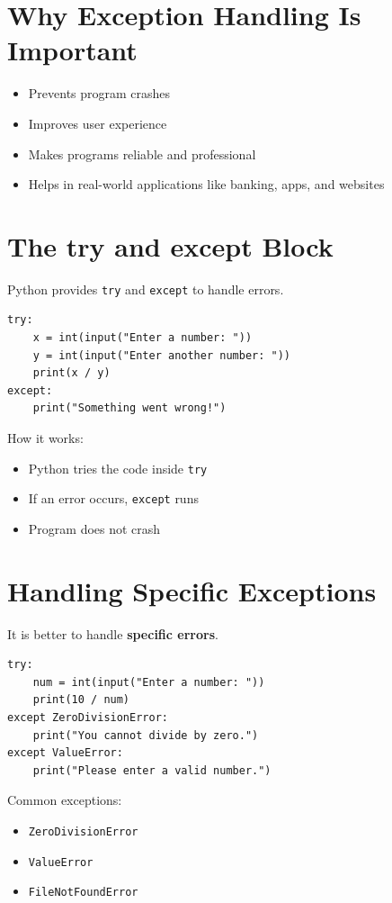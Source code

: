 \section{Why Exception Handling Is Important}

\begin{itemize}
    \item Prevents program crashes
    \item Improves user experience
    \item Makes programs reliable and professional
    \item Helps in real-world applications like banking, apps, and websites
\end{itemize}

\section{The try and except Block}

Python provides \texttt{try} and \texttt{except} to handle errors.

\begin{verbatim}
try:
    x = int(input("Enter a number: "))
    y = int(input("Enter another number: "))
    print(x / y)
except:
    print("Something went wrong!")
\end{verbatim}

How it works:
\begin{itemize}
    \item Python tries the code inside \texttt{try}
    \item If an error occurs, \texttt{except} runs
    \item Program does not crash
\end{itemize}

\section{Handling Specific Exceptions}

It is better to handle \textbf{specific errors}.

\begin{verbatim}
try:
    num = int(input("Enter a number: "))
    print(10 / num)
except ZeroDivisionError:
    print("You cannot divide by zero.")
except ValueError:
    print("Please enter a valid number.")
\end{verbatim}

Common exceptions:
\begin{itemize}
    \item \texttt{ZeroDivisionError}
    \item \texttt{ValueError}
    \item \texttt{FileNotFoundError}
\end{itemize}

